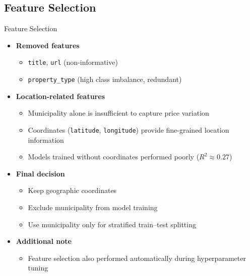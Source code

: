 \documentclass{beamer}
\begin{document}
    \subsection{Feature Selection}
      \begin{frame}{Feature Selection}

        \begin{itemize}
          \item \textbf{Removed features}
            \begin{itemize}
              \item \texttt{title}, \texttt{url} (non-informative)
              \item \texttt{property\_type} (high class imbalance, redundant)
            \end{itemize}

          \vspace{0.4em} \pause

          \item \textbf{Location-related features}
            \begin{itemize}
              \item Municipality alone is insufficient to capture price variation
              \item Coordinates (\texttt{latitude}, \texttt{longitude}) provide fine-grained location information
              \item Models trained without coordinates performed poorly (\(R^2 \approx 0.27\))
            \end{itemize}

          \vspace{0.4em} \pause

          \item \textbf{Final decision}
            \begin{itemize}
              \item Keep geographic coordinates
              \item Exclude municipality from model training
              \item Use municipality only for stratified train–test splitting
            \end{itemize}

          \vspace{0.4em} \pause

          \item \textbf{Additional note}
            \begin{itemize}
              \item Feature selection also performed automatically during hyperparameter tuning
            \end{itemize}

        \end{itemize}
      \end{frame}
\end{document}
